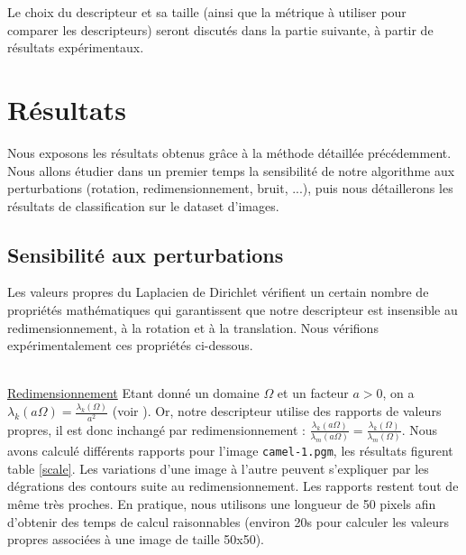 \documentclass[a4paper,10pt]{article} %
\theoremstyle{definition} %
\begin{document}
Le choix du descripteur et sa taille (ainsi que la métrique à utiliser pour comparer les descripteurs) seront discutés dans la partie suivante, à partir de résultats expérimentaux.





\section{Résultats}

Nous exposons les résultats obtenus grâce à la méthode détaillée précédemment. Nous allons étudier dans un premier temps la sensibilité de notre algorithme aux perturbations (rotation, redimensionnement, bruit, ...), puis nous détaillerons les résultats de classification sur le dataset d'images.


  \subsection{Sensibilité aux perturbations}

Les valeurs propres du Laplacien de Dirichlet vérifient un certain nombre de propriétés mathématiques qui garantissent que notre descripteur est insensible au redimensionnement, à la rotation et à la translation. Nous vérifions expérimentalement ces propriétés ci-dessous.

~\\
\underline{Redimensionnement} Etant donné un domaine $\Omega$ et un facteur $a > 0$, on a $\lambda_k(a \Omega) = \frac{\lambda_k(\Omega)}{a^2}$ (voir \cite{KhabouHR07}). Or, notre descripteur utilise des rapports de valeurs propres, il est donc inchangé par redimensionnement : $\frac{\lambda_k(a \Omega)}{\lambda_m(a \Omega)} = \frac{\lambda_k(\Omega)}{\lambda_m(\Omega)}$. Nous avons calculé différents rapports pour l'image \texttt{camel-1.pgm}, les résultats figurent table \ref{scale}. Les variations d'une image à l'autre peuvent s'expliquer par les dégrations des contours suite au redimensionnement. Les rapports restent tout de même très proches. En pratique, nous utilisons une longueur de 50 pixels afin d'obtenir des temps de calcul raisonnables (environ 20s pour calculer les valeurs propres associées à une image de taille 50x50).
\end{document}
